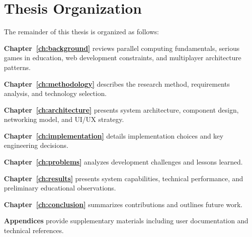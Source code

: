 \section{Thesis Organization}
\label{sec:thesis-organization}

The remainder of this thesis is organized as follows:

\textbf{Chapter~\ref{ch:background}} reviews parallel computing fundamentals, serious games in education, web development constraints, and multiplayer architecture patterns.

\textbf{Chapter~\ref{ch:methodology}} describes the research method, requirements analysis, and technology selection.

\textbf{Chapter~\ref{ch:architecture}} presents system architecture, component design, networking model, and UI/UX strategy.

\textbf{Chapter~\ref{ch:implementation}} details implementation choices and key engineering decisions.

\textbf{Chapter~\ref{ch:problems}} analyzes development challenges and lessons learned.

\textbf{Chapter~\ref{ch:results}} presents system capabilities, technical performance, and preliminary educational observations.

\textbf{Chapter~\ref{ch:conclusion}} summarizes contributions and outlines future work.

\textbf{Appendices} provide supplementary materials including user documentation and technical references.


